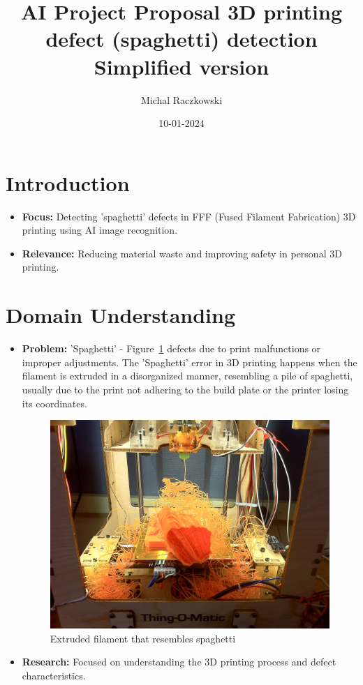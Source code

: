 \documentclass[12pt,a4paper]{article}
\title{{\textbf{AI Project Proposal 3D printing defect (spaghetti) detection}}\\ {\small Simplified version}}
\author{Michal Raczkowski}
\date{10-01-2024}
\begin{document}
\maketitle
\thispagestyle{empty} %

\newpage
\tableofcontents
\newpage

\setcounter{page}{1} %

\section{Introduction}
\begin{itemize}
    \item \textbf{Focus:} Detecting 'spaghetti' defects in FFF (Fused Filament Fabrication) 3D printing using AI image recognition.
    \item \textbf{Relevance:} Reducing material waste and improving safety in personal 3D printing.
\end{itemize}

\section{Domain Understanding}
\begin{itemize}
    \item \textbf{Problem:} 'Spaghetti' - Figure~\ref{fig:spaghetti3D} defects due to print malfunctions or improper adjustments.
    The 'Spaghetti' error in 3D printing happens when the filament is extruded in a disorganized manner, resembling a pile of spaghetti, usually due to the print not adhering to the build plate or the printer losing its coordinates.
    \begin{figure}[h]
    \centering
    \includegraphics[width=0.5\linewidth]{spaghetti3D.jpg}
    \caption{Extruded filament that resembles spaghetti}
    \label{fig:spaghetti3D}
    \end{figure}

    \item \textbf{Research:} Focused on understanding the 3D printing process and defect characteristics.
\end{itemize}
\end{document}
